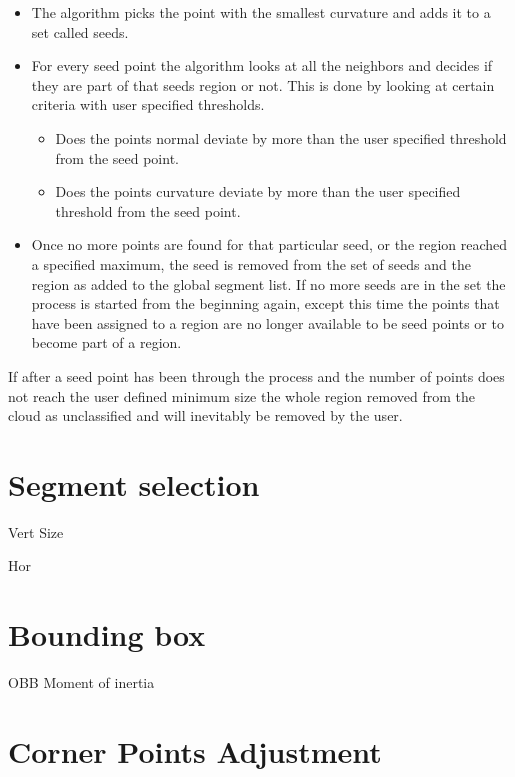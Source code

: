 	\renewcommand\labelitemi{{\boldmath$\cdot$}}
	\begin{itemize}
		\item The algorithm picks the point with the smallest curvature and adds it to a set called seeds.
		
		\item For every seed point the algorithm looks at all the neighbors and decides if they are part of that seeds region or not. This is done by looking at certain criteria with user specified thresholds.
		
		\begin{itemize}
			\item Does the points normal deviate by more than the user specified threshold from the seed point.
			
			\item Does the points curvature deviate by more than the user specified threshold from the seed point.
			
		\end{itemize}
		
		\item Once no more points are found for that particular seed, or the region reached a specified maximum, the seed is removed from the set of seeds and the region as added to the global segment list. If no more seeds are in the set the process is started from the beginning again, except this time the points that have been assigned to a region are no longer available to be seed points or to become part of a region.
		
	\end{itemize}
	
	If after a seed point has been through the process and the number of points does not reach the user defined minimum size the whole region removed from the cloud as unclassified and will inevitably be removed by the user.
	
	\section{Segment selection}
		Vert
		Size
		
		Hor
		
	\section{Bounding box}
		OBB
		Moment of inertia
		
	\section{Corner Points Adjustment}
	
